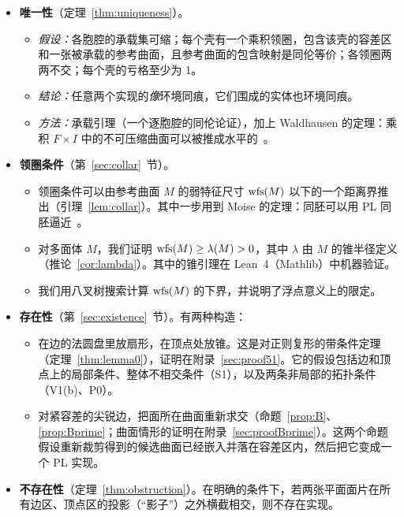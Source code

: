 \begin{itemize}
\item \textbf{唯一性}（定理~\ref{thm:uniqueness}）。
  \begin{itemize}
  \item \emph{假设：}各胞腔的承载集可缩；每个壳有一个乘积领圈，包含该壳的容差区和一张被承载的参考曲面，且参考曲面的包含映射是同伦等价；各领圈两两不交；每个壳的亏格至少为 1。
  \item \emph{结论：}任意两个实现的\emph{像}环境同痕，它们围成的实体也环境同痕。
  \item \emph{方法：}承载引理（一个逐胞腔的同伦论证），加上 Waldhausen 的定理：乘积 $F\times I$ 中的不可压缩曲面可以被推成水平的~\cite[Prop.~3.1]{Waldhausen68}。
  \end{itemize}
\item \textbf{领圈条件}（第~\ref{sec:collar}~节）。
  \begin{itemize}
  \item 领圈条件可以由参考曲面 $M$ 的弱特征尺寸 $\operatorname{wfs}(M)$ 以下的一个距离界推出（引理~\ref{lem:collar}）。其中一步用到 Moise 的定理：同胚可以用 PL 同胚逼近~\cite[Thm.~35.2]{Moise77}。
  \item 对多面体 $M$，我们证明 $\operatorname{wfs}(M)\ge\lambda(M)>0$，其中 $\lambda$ 由 $M$ 的锥半径定义（推论~\ref{cor:lambda}）。其中的锥引理在 Lean~4（Mathlib）中机器验证。
  \item 我们用八叉树搜索计算 $\operatorname{wfs}(M)$ 的下界，并说明了浮点意义上的限定。
  \end{itemize}
\item \textbf{存在性}（第~\ref{sec:existence}~节）。有两种构造：
  \begin{itemize}
  \item 在边的法圆盘里放扇形，在顶点处放锥。这是对正则复形的带条件定理（定理~\ref{thm:lemma0}），证明在附录~\ref{sec:proof51}。它的假设包括边和顶点上的局部条件、整体不相交条件（S1），以及两条非局部的拓扑条件（V1(b)、P0）。
  \item 对紧容差的尖锐边，把面所在曲面重新求交（命题~\ref{prop:B}、\ref{prop:Bprime}；曲面情形的证明在附录~\ref{sec:proofBprime}）。这两个命题假设重新裁剪得到的候选曲面已经嵌入并落在容差区内，然后把它变成一个 PL 实现。
  \end{itemize}
\item \textbf{不存在性}（定理~\ref{thm:obstruction}）。在明确的条件下，若两张平面面片在所有边区、顶点区的投影（``影子''）之外横截相交，则不存在实现。
\end{itemize}

